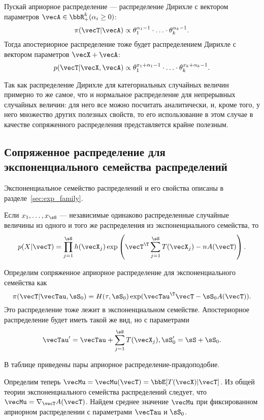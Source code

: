 Пускай априорное распределение --- распределение Дирихле с вектором параметров $\vecA \in \bbR_+^k (\alpha_i \geq 0)$:
\[
\pi(\vecT | \vecA) \propto \theta_1^{\alpha_1 - 1} \cdot \ldots \cdot \theta_k^{\alpha_k - 1}.
\]
Тогда апостериорное распределение тоже будет распределением Дирихле с вектором параметров $\vecX + \vecA$:
\[
p(\vecT | \vecX, \vecA) \propto \theta_1^{x_1 + \alpha_1 - 1} \cdot \ldots \cdot \theta_k^{x_k + \alpha_k - 1}.
\]

Так как распределение Дирихле для категориальных случайных величин примерно то же самое, что и нормальное распределение для непрерывных случайных величин: для него все можно посчитать аналитически, и, кроме того, у него множество других полезных свойств, то его использование в этом случае в 
качестве сопряженного распределения представляется крайне полезным.



\subsection{Сопряженное распределение для экспоненциального семейства распределений}
Экспоненциальное семейство распределений и его свойства описаны в разделе~\ref{sec:exp_family}.

Если $x_1, \ldots, x_\sS$ --- независимые одинаково распределенные случайные величины из одного и того же распределения из экспоненциального семейства, то
\[
p(X | \vecT) = \prod_{j = 1}^{\sS} h(\vecX_j) \exp \left(\vecT^\T \sum_{j = 1}^\sS T(\vecX_j) - n A(\vecT) \right).
\]

Определим сопряженное априорное распределение для экспоненциального семейства как
\[
\pi(\vecT | \vecTau, \sS_0) = H(\tau, \sS_0) \exp(\vecTau^\T \vecT - \sS_0 A(\vecT)).
\]
Это распределение тоже лежит в экспоненциальном семействе.
Апостериорное распределение будет иметь такой же вид, 
но с параметрами 
\[
\vecTau' = \vecTau + \sum_{j = 1}^\sS T(\vecX_j), \sS'_0 = \sS + \sS_0.
\]

В таблице приведены пары априорное распределение-правдоподобие.

Определим теперь $\vecMu = \vecMu(\vecT) = \bbE [T(\vecX) | \vecT]$.
Из общей теории экспоненциального семейства распределений 
следует, что $\vecMu = \nabla_{\vecT} A(\vecT)$.
Найдем среднее значение $\vecMu$ при фиксированном априорном распределении с параметрами $\vecTau$ и $\sS_0$.

